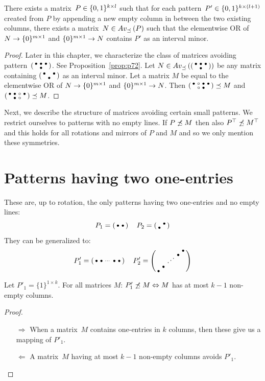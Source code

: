 \begin{prop}
There exists a matrix~$P\in\{0,1\}^{k\times l}$ such that for each pattern~$P'\in\{0,1\}^{k\times(l+1)}$ created from $P$ by appending a new empty column in between the two existing columns, there exists a matrix~$N\in Av_{\preceq}\left(P\right)$ such that the elementwise OR of $N\rightarrow\{0\}^{m\times 1}$ and $\{0\}^{m\times 1}\rightarrow N$ contains $P'$ as an interval minor.
\end{prop}
\begin{proof}
Later in this chapter, we characterize the class of matrices avoiding pattern~$\left(\begin{smallmatrix}\bullet&\bullet&\bullet\\ &\bullet& \end{smallmatrix}\right)$. See Proposition~\ref{prop:p72}. Let $N\in Av_{\preceq}\left(\left(\begin{smallmatrix}\bullet&\bullet&\bullet\\ &\bullet& \end{smallmatrix}\right)\right)$ be any matrix containing $\left(\begin{smallmatrix}\bullet& &\bullet\\ &\bullet& \end{smallmatrix}\right)$ as an interval minor. Let a matrix $M$ be equal to the elementwise OR of $N\rightarrow\{0\}^{m\times 1}$ and $\{0\}^{m\times 1}\rightarrow N$. Then $\left(\begin{smallmatrix}\bullet&\circ&\bullet&\bullet\\ &\circ&\bullet& \end{smallmatrix}\right)\preceq M$ and $\left(\begin{smallmatrix}\bullet&\bullet&\circ&\bullet\\ &\bullet&\circ& \end{smallmatrix}\right)\preceq M$.
\end{proof}

Next, we describe the structure of matrices avoiding certain small patterns. We restrict ourselves to patterns with no empty lines. If $P\not\preceq M$ then also $P^\top\not\preceq M^\top$ and this holds for all rotations and mirrors of $P$ and $M$ and so we only mention these symmetries.

\section{Patterns having two one-entries}
\label{sec:2ones}
These are, up to rotation, the only patterns having two one-entries and no empty lines:
$$P_1=\smm{\bullet&\bullet}\ \ 
\ P_2=\smm{ &\bullet\\\bullet& }$$
They can be generalized to:
$$P'_1=\smm{\bullet&\bullet&\cdots&\bullet&\bullet}\ \ 
\ P'_2=\smm{ & & & &\bullet\\ & & &\bullet& \\ & &\Ddots& & \\ &\bullet& & & \\\bullet& & & & }$$

\begin{prop}
Let $P'_1=\{1\}^{1\times k}$. For all matrices $M$: $P'_1\not\preceq M\Leftrightarrow M$ has at most $k-1$ non-empty columns.
\end{prop}
\begin{proof}
\begin{itemize}
	\item[$\Rightarrow$] When a matrix~$M$ contains one-entries in $k$ columns, then these give us a mapping of $P'_1$.
	\item[$\Leftarrow$] A matrix~$M$ having at most $k-1$ non-empty columns avoids $P'_1$. \qedhere
\end{itemize}
\end{proof}

